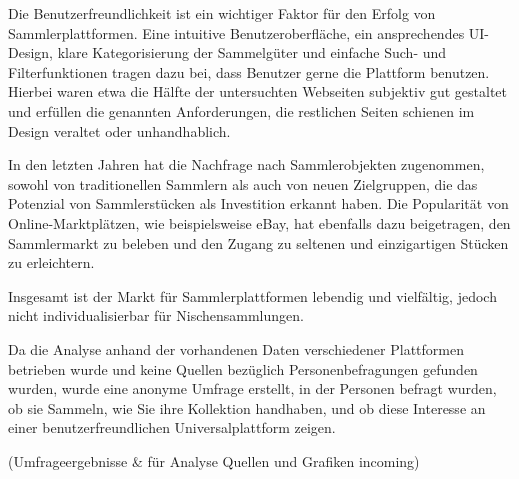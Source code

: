 Die Benutzerfreundlichkeit ist ein wichtiger Faktor für den Erfolg von Sammlerplattformen.
Eine intuitive Benutzeroberfläche, ein ansprechendes UI-Design, klare Kategorisierung der Sammelgüter und einfache Such- und Filterfunktionen tragen dazu bei, dass Benutzer gerne die Plattform benutzen.
Hierbei waren etwa die Hälfte der untersuchten Webseiten subjektiv gut gestaltet und erfüllen die genannten Anforderungen, die restlichen Seiten schienen im Design veraltet oder unhandhablich. \par

In den letzten Jahren hat die Nachfrage nach Sammlerobjekten zugenommen, sowohl von traditionellen Sammlern als auch von neuen Zielgruppen, die das Potenzial von Sammlerstücken als Investition erkannt haben.
Die Popularität von Online-Marktplätzen, wie beispielsweise eBay, hat ebenfalls dazu beigetragen, den Sammlermarkt zu beleben und den Zugang zu seltenen und einzigartigen Stücken zu erleichtern. \par
Insgesamt ist der Markt für Sammlerplattformen lebendig und vielfältig, jedoch nicht individualisierbar für Nischensammlungen. \par
Da die Analyse anhand der vorhandenen Daten verschiedener Plattformen betrieben wurde und keine Quellen bezüglich Personenbefragungen gefunden wurden, wurde eine anonyme Umfrage erstellt, in der Personen befragt wurden, ob sie Sammeln, wie Sie ihre Kollektion handhaben, und ob diese Interesse an einer benutzerfreundlichen Universalplattform zeigen. \linebreak

(Umfrageergebnisse \& für Analyse Quellen und Grafiken incoming)

